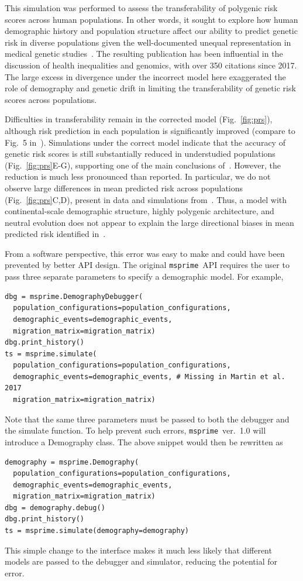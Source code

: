 \documentclass{article}
\newcommand{\msprime}[0]{\texttt{msprime}}
\begin{document}
This simulation was performed to assess the
transferability of polygenic risk scores across human populations. In other words, it sought to
explore how human demographic history and population structure affect our ability
to predict genetic risk in diverse populations given the well-documented unequal representation
in medical genetic studies~\citep{popejoy2016genomics}. The resulting publication has been
influential in the discussion of health inequalities and genomics, with over 350 citations since 2017.
The large excess in divergence under the incorrect model here exaggerated the role of demography
and genetic drift in limiting the transferability of genetic risk scores across populations.

Difficulties in transferability remain in the corrected model (Fig.~\ref{fig:prs}), although
risk prediction in each population is significantly improved (compare to Fig.~5 in~\citet{martin2017human}).
Simulations under the correct model indicate that the accuracy of genetic risk scores is still
substantially reduced in understudied populations (Fig.~\ref{fig:prs}E-G),
supporting one of the main conclusions of~\citet{martin2017human}.
However, the reduction is much less pronounced than reported.
In particular, we do not observe large differences in mean predicted risk
across populations (Fig.~\ref{fig:prs}C,D), present in data and simulations from~\citet{martin2017human}.
Thus, a model with continental-scale demographic structure, highly polygenic architecture, and
neutral evolution does not appear to explain the large directional biases
in mean predicted risk identified in~\citet{martin2017human}.

From a software perspective, this error was easy to make
and could have been prevented by better API design.
The original \msprime\ API requires the user to pass
three separate parameters to specify a demographic model. For example,
\begin{verbatim}
dbg = msprime.DemographyDebugger(
  population_configurations=population_configurations,
  demographic_events=demographic_events,
  migration_matrix=migration_matrix)
dbg.print_history()
ts = msprime.simulate(
  population_configurations=population_configurations,
  demographic_events=demographic_events, # Missing in Martin et al. 2017
  migration_matrix=migration_matrix)
\end{verbatim}
Note that the same three parameters must be passed to both the debugger
and the simulate function.
To help prevent such errors,
\msprime~ver.~1.0 will introduce a Demography class. The above
snippet would then be rewritten as
\begin{verbatim}
demography = msprime.Demography(
  population_configurations=population_configurations,
  demographic_events=demographic_events,
  migration_matrix=migration_matrix)
dbg = demography.debug()
dbg.print_history()
ts = msprime.simulate(demography=demography)
\end{verbatim}
This simple change to the interface makes it much less likely
that different models are passed to the debugger and simulator,
reducing the potential for error.
\end{document}
